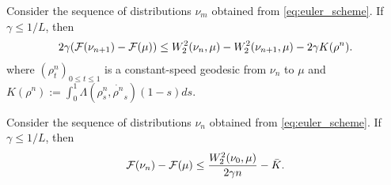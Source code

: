 
\begin{proposition}\label{prop:evi}
	Consider the sequence of distributions $\nu_m$ obtained from \cref{eq:euler_scheme}. If $\gamma \leq 1/L$, then
	\begin{align}
2\gamma({{\mathcal F}}(\nu_{n+1})-{{\mathcal F}}(\mu))
\leq 
W_2^2(\nu_n,\mu)-W_2^2(\nu_{n+1},\mu)-2\gamma K(\rho^n).
\label{eq:evi}
\end{align}
where $(\rho^n_t)_{0\leq t \leq 1}$ is a constant-speed geodesic from $\nu_n$ to $\mu$ and $K(\rho^n):=\int_0^1 \Lambda(\rho^n_s,\dot{\rho^n}_s)(1-s)ds$.
\end{proposition}

\begin{theorem}\label{th:rates_mmd}
	Consider the sequence of distributions $\nu_n$ obtained from \cref{eq:euler_scheme}. If $\gamma \leq 1/L$, then
\begin{align}
{{\mathcal F}}(\nu_n)-{{\mathcal F}}(\mu)\leq  \frac{W_2^2(\nu_0,\mu)}{2 \gamma n} -\bar{K}.
\end{align}
\end{theorem}






